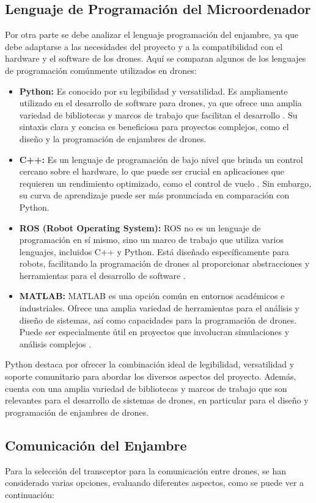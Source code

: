 \subsection{Lenguaje de Programación del Microordenador}
Por otra parte se debe analizar el lenguaje programación del enjambre, ya que debe adaptarse a las necesidades del proyecto y a la compatibilidad con el hardware y el software de los drones. Aquí se comparan algunos de los lenguajes de programación comúnmente utilizados en drones:
\begin{itemize}
\item \textbf{Python:}
Es conocido por su legibilidad y versatilidad. Es ampliamente utilizado en el desarrollo de software para drones, ya que ofrece una amplia variedad de bibliotecas y marcos de trabajo que facilitan el desarrollo \cite{ python}. Su sintaxis clara y concisa es beneficiosa para proyectos complejos, como el diseño y la programación de enjambres de drones.
\item \textbf{C++:}
Es un lenguaje de programación de bajo nivel que brinda un control cercano sobre el hardware, lo que puede ser crucial en aplicaciones que requieren un rendimiento optimizado, como el control de vuelo \cite{ cmasmas}. Sin embargo, su curva de aprendizaje puede ser más pronunciada en comparación con Python.
\item \textbf{ROS (Robot Operating System):}
ROS no es un lenguaje de programación en sí mismo, sino un marco de trabajo que utiliza varios lenguajes, incluidos C++ y Python. Está diseñado específicamente para robots, facilitando la programación de drones al proporcionar abstracciones y herramientas para el desarrollo de software \cite{ros}.
\item \textbf{MATLAB:}
MATLAB es una opción común en entornos académicos e industriales. Ofrece una amplia variedad de herramientas para el análisis y diseño de sistemas, así como capacidades para la programación de drones. Puede ser especialmente útil en proyectos que involucran simulaciones y análisis complejos \cite{matlab}.
\end{itemize}
Python destaca por ofrecer la combinación ideal de legibilidad, versatilidad y soporte comunitario para abordar los diversos aspectos del proyecto. Además, cuenta con una amplia variedad de bibliotecas y marcos de trabajo que son relevantes para el desarrollo de sistemas de drones, en particular para el diseño y programación de enjambres de drones.

\subsection{Comunicación del Enjambre}
Para la selección del transceptor para la comunicación entre drones, se han considerado varias opciones, evaluando diferentes aspectos, como se puede ver a continuación:

